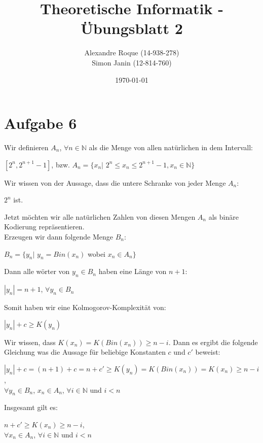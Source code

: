 \documentclass{article}
\title{Theoretische Informatik - Übungsblatt 2}
\author{Alexandre Roque (14-938-278)\\Simon Janin (12-814-760)}
\date{\today}
\begin{document}
    \maketitle
    

    \section*{Aufgabe 6}
    
    Wir definieren $A_{n}$, $\forall n \in \mathbb{N}$ als die Menge von allen natürlichen in dem Intervall:
    \begin{center}
    $[2^n, 2^{n+1} - 1]$, bzw. $A_{n} = \{x_{n}|$ $2^n \le x_{n} \le 2^{n+1} - 1, x_{n} \in \mathbb{N}\}$
    \end{center}
    
    
    \par 
    \noindent
    Wir wissen von der Aussage, dass die untere Schranke von jeder Menge $A_{n}$: 
	\begin{center}
	$2^n$ ist. \\
\end{center}	    
   
   	\noindent
    Jetzt möchten wir alle natürlichen Zahlen von diesen Mengen $A_{n}$ als binäre Kodierung repräsentieren. \\
	Erzeugen wir dann folgende Menge $B_{n}$:
	
	\begin{center}
	 $B_{n} = \{y_{n} |$ $y_{n} = Bin(x_{n})$ wobei $x_{n} \in A_{n}\}$
\end{center}	    
    
    
    \par 
  	\noindent
  	Dann alle wörter von $y_{n} \in B_{n}$ haben eine Länge von $n + 1$:
	\begin{center}
	$|y_{n}| = n + 1$, $\forall y_{n} \in B_{n}$
\end{center}	  	
  
    \par 
    \noindent
    Somit haben wir eine Kolmogorov-Komplexität von: 
    \begin{center}
    $|y_{n}| + c \ge K(y_{n})$
    \end{center}
    \par 
    \noindent
    Wir wissen, dass $K(x_{n}) = K(Bin(x_{n})) \ge n - i$. Dann es ergibt die folgende Gleichung was  die Aussage für beliebige Konstanten $c$ und $c'$ beweist: 
    \begin{center}
    $|y_{n}| + c = (n + 1) + c = n + c' \ge K(y_{n}) = K(Bin(x_{n})) = K(x_{n}) \ge n - i$, \\
    $\forall y_{n} \in B_{n}$, $x_{n} \in A_{n}$, $\forall i \in \mathbb{N}$ und $i < n$
    \end{center}
    
    \par 
    \noindent
    Insgesamt gilt es:
    \begin{center}
    $n + c' \ge K(x_{n}) \ge n - i$, \\
   	$\forall x_{n} \in A_{n}$, $\forall i \in \mathbb{N}$ und $i < n$
    \end{center}
\end{document}
